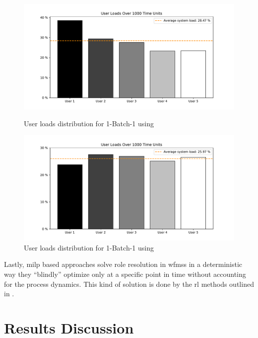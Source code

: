 \begin{figure}[!ht]
	\centering
	\begin{minipage}[b]{0.45\textwidth}
		\includegraphics[width=\textwidth]{img/1_BATCHONE_MSA_NU5_GI3_SIM1000_FAIR}
		\caption{User loads distribution for 1-Batch-1 using }
		\label{fig:msa_fairness}
	\end{minipage}
	\hfill
	\begin{minipage}[b]{0.45\textwidth}
		\includegraphics[width=\textwidth]{img/1_BATCHONE_ST_NU5_GI3_SIM1000_FAIR}
		\caption{User loads distribution for 1-Batch-1 using }
		\label{fig:st_fairness}
	\end{minipage}
\end{figure}

Lastly, \gls{milp} based approaches solve role resolution in \glspl{wfms} in a deterministic way \ie they ``blindly'' optimize only at a specific point in time without accounting for the process dynamics. This kind of solution is done by the \gls{rl} methods outlined in .

\section{ Results Discussion}
\label{sec:rl_discussion}

